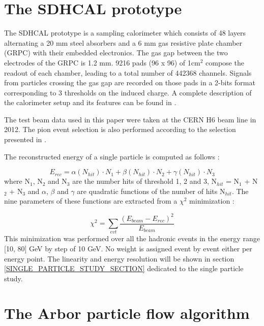 \documentclass[cits]{JINST}
\begin{document}
\newpage
\section{The SDHCAL prototype}

The SDHCAL prototype is a sampling calorimeter which consists of 48 layers alternating a 20 mm steel absorbers and a 6 mm gas resistive plate chamber (GRPC) with their embedded electronics. The gas gap between the two electrodes of the GRPC is 1.2 mm. 9216 pads (96 x 96) of 1cm$^2$ compose the readout of each chamber, leading to a total number of 442368 channels. Signals from particles crossing the gas gap are recorded on those pads in a 2-bits format corresponding to 3 thresholds on the induced charge. A complete description of the calorimeter setup and its features can be found in \cite{sdhcal-paper}. 

The test beam data used in this paper were taken at the CERN H6 beam line in 2012. The pion event selection is also performed according to the selection presented in \cite{sdhcal-paper}.

The reconstructed energy of a single particle is computed as follows :

\begin{equation}
  E_{rec} = \alpha(N_{hit}) \cdot N_{1}
          + \beta(N_{hit}) \cdot N_{2}
          + \gamma(N_{hit}) \cdot N_{3}   
\end{equation}
where N$_1$, N$_2$ and N$_3$ are the number hits of threshold 1, 2 and 3, N$_{hit}$ = N$_1$ + N$_2$ + N$_3$ and $\alpha$, $\beta$ and $\gamma$ are quadratic functions of the number of hits N$_{hit}$. The nine parameters of these functions are extracted from a $\chi^2$ minimization :

\begin{equation}
  \chi^2 = \sum\limits_{evt} \frac{(E_{beam} - E_{rec})^2}{E_{beam}}
\end{equation}
This minimization was performed over all the hadronic events in the energy range [10, 80] GeV by step of 10 GeV. No weight is assigned event by event either per energy point. The linearity and energy resolution will be shown in section \ref{SINGLE_PARTICLE_STUDY_SECTION} dedicated to the single particle study.

\newpage
\section{The Arbor particle flow algorithm}
\end{document}
